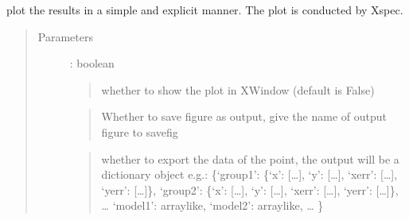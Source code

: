 \documentclass[letterpaper,10pt,english]{sphinxmanual}
\begin{document}
\begin{fulllineitems}
\begin{fulllineitems}
\begin{quote}
\begin{description}
\end{description}\end{quote}

\end{fulllineitems}


\begin{fulllineitems}
\label{\detokenize{APIdocs/xspecanalysis:ixpetools.xspeclib.io.XspecSpec.plot}}
\sphinxAtStartPar
plot the results in a simple and explicit
manner. The plot is conducted by Xspec.
\begin{quote}\begin{description}
\item[{Parameters}] \leavevmode
\sphinxAtStartPar
{} : boolean
\begin{quote}

\sphinxAtStartPar
whether to show the plot in XWindow (default is False)
\end{quote}

\sphinxAtStartPar
{}
\begin{quote}

\sphinxAtStartPar
Whether to save figure as output, give the name of output figure
to savefig
\end{quote}

\sphinxAtStartPar
{}
\begin{quote}

\sphinxAtStartPar
whether to export the data of the point, the output will be
a dictionary object
e.g.:
\{‘group1’: \{‘x’: {[}…{]}, ‘y’: {[}…{]}, ‘xerr’: {[}…{]}, ‘yerr’: {[}…{]}\},
‘group2’:  \{‘x’: {[}…{]}, ‘y’: {[}…{]}, ‘xerr’: {[}…{]}, ‘yerr’: {[}…{]}\},
…
‘model1’: array\sphinxhyphen{}like,
‘model2’: array\sphinxhyphen{}like,
…
\}
\end{quote}

\end{description}\end{quote}

\end{fulllineitems}


\end{fulllineitems}
\end{document}
